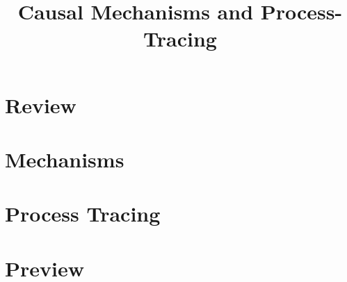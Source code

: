 
\usepackage{tikz}
\usetikzlibrary{shapes,arrows}

\title{Causal Mechanisms and Process-Tracing}



\date[]{}



\frame{\titlepage}

\frame{\tableofcontents}

\section{Review}
\frame{\tableofcontents[currentsection]}




\section{Mechanisms}
\frame{\tableofcontents[currentsection]}





\section{Process Tracing}
\frame{\tableofcontents[currentsection]}



\section{Preview}
\frame{\tableofcontents[currentsection]}




\appendix
\frame{}



